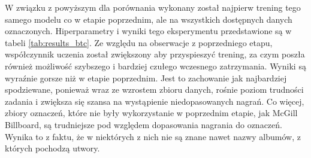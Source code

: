 W związku z powyższym dla porównania wykonany został najpierw trening tego samego modelu co w etapie poprzednim, ale na wszystkich dostępnych danych oznaczonych. Hiperparametry i wyniki tego eksperymentu przedstawione są w tabeli \ref{tab:results_btc}. Ze względu na obserwacje z poprzedniego etapu, współczynnik uczenia został zwiększony aby przyspieszyć trening, za czym poszła również możliwość szybszego i bardziej czułego wczesnego zatrzymania. Wyniki są wyraźnie gorsze niż w etapie poprzednim. Jest to zachowanie jak najbardziej spodziewane, ponieważ wraz ze wzrostem zbioru danych, rośnie poziom trudności zadania i zwiększa się szansa na wystąpienie niedopasowanych nagrań. Co więcej, zbiory oznaczeń, które nie były wykorzystanie w poprzednim etapie, jak McGill Billboard, są trudniejsze pod względem dopasowania nagrania do oznaczeń. Wynika to z faktu, że w niektórych z nich nie są znane nawet nazwy albumów, z których pochodzą utwory.

